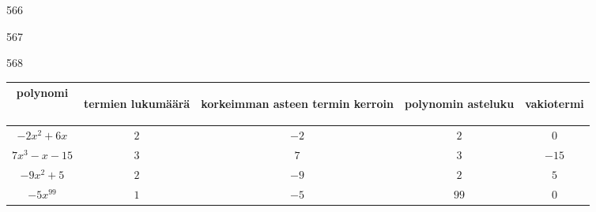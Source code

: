 \begin{Vastaus}{566}
    
\end{Vastaus}
\begin{Vastaus}{567}
	
\end{Vastaus}
\begin{Vastaus}{568}
    \begin{footnotesize}
	    \begin{tabular}{|c|c|c|c|c|}
	     \hline
polynomi     & \begin{sideways}termien lukumäärä\end{sideways}%
& \begin{sideways}korkeimman asteen termin kerroin\end{sideways}%
& \begin{sideways}polynomin asteluku\end{sideways}%
& \begin{sideways}vakiotermi\end{sideways} \\ \hline
$-2x^2+6x$   &        $2$          &         $-2$      &       $2$             &    $0$       \\ \hline
$7x^3-x-15$  &        $3$          &           $7$       &       $3$             &    $-15$   \\ \hline
$-9x^2+5$    &        $2$          &          $-9$     &       $2$             &    $5$       \\ \hline
$-5x^{99}$   &        $1$          &          $-5$     &       $99$            &         $0$      \\ \hline
   	  \end{tabular}
      \end{footnotesize}
     
\end{Vastaus}
